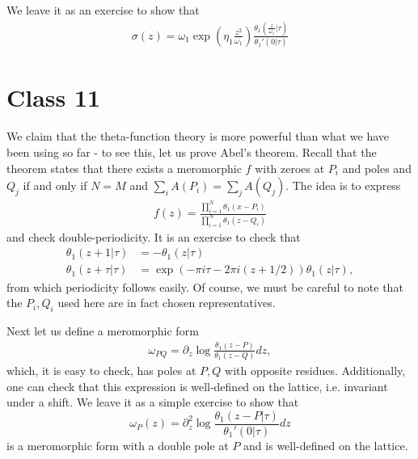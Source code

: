\documentclass{../mathnotes}
\begin{document}
We leave it as an exercise to show that
\begin{align*}
    \sigma(z)=\omega_1\exp\left( \eta_1\frac{z^2}{\omega_1}\right)\frac{\theta_1\left( \frac{z}{\omega_1}|\tau \right)}{\theta_1'(0|\tau)}
\end{align*}

\section*{Class 11}

We claim that the theta-function theory is more powerful than what we have been using so far - to see this, let us prove Abel's theorem.
Recall that the theorem states that there exists a meromorphic $f$ with zeroes at $P_i$ and poles and $Q_j$ if and only if $N=M$ and $\sum_i A(P_i)=\sum_j A(Q_j)$.
The idea is to express
\begin{align*}
    f(z)=\frac{\prod_{i=1}^N\theta_1(x-P_i)}{\prod_{i=1}^N\theta_1(z-Q_i)}
\end{align*}
and check double-periodicity. It is an exercise to check that
\begin{align*}
    \theta_1(z+1|\tau)&=-\theta_1(z|\tau)\\
    \theta_1(z+\tau|\tau)&=\exp\left( -\pi i\tau-2\pi i(z+1/2) \right)\theta_1(z|\tau),
\end{align*}
from which periodicity follows easily. Of course, we must be careful to note that the $P_i,Q_i$ used here are in fact chosen representatives.

Next let us define a meromorphic form
\begin{align*}
    \omega_{PQ}=\partial_z\log\frac{\theta_1(z-P)}{\theta_1(z-Q)}dz,
\end{align*}
which, it is easy to check, has poles at $P,Q$ with opposite residues. Additionally, one can check that this expression is well-defined on the lattice, 
i.e. invariant under a shift. We leave it as a simple exercise to show that
\[\omega_P(z)=\partial^2_z\log\frac{\theta_1(z-P|\tau)}{\theta_1'(0|\tau)}dz\]
is a meromorphic form with a double pole at $P$ and is well-defined on the lattice.
\end{document}
